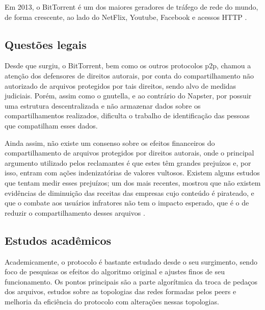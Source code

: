 Em 2013, o BitTorrent é um dos maiores geradores de tráfego de rede do mundo, de forma
crescente, ao lado do NetFlix, Youtube, Facebook e acessos HTTP
\cite{report:internet-usage-2013}.

\subsection*{Questões legais}

Desde que surgiu, o BitTorrent, bem como os outros protocolos \gls*{p2p}, chamou a
atenção dos defensores de direitos autorais, por conta do compartilhamento não
autorizado de arquivos protegidos por tais direitos, sendo alvo de medidas judiciais.
Porém, assim como o \gls*{gnutella}, e ao contrário do Napster, por possuir uma
estrutura descentralizada e não armazenar dados sobre os compartilhamentos realizados,
dificulta o trabalho de identificação das pessoas que compatilham esses dados.

Ainda assim, não existe um consenso sobre os efeitos financeiros do compartilhamento de
arquivos protegidos por direitos autorais, onde o principal argumento utilizado pelos
reclamantes é que estes têm grandes prejuízos e, por isso, entram com ações
indenizatórias de valores vultosos. Existem alguns estudos que tentam medir esses
prejuízos; um dos mais recentes, mostrou que não existem evidências de diminuição das
receitas das empresas cujo conteúdo é pirateado, e que o combate aos usuários
infratores não tem o impacto esperado, que é o de reduzir o compartilhamento desses
arquivos \cite{report:lse-piracy}.

\subsection*{Estudos acadêmicos}

Academicamente, o protocolo é bastante estudado desde o seu surgimento, sendo foco de
pesquisas os efeitos do algoritmo original e ajustes finos de seu funcionamento. Os
pontos principais são a parte algorítmica da troca de pedaços dos arquivos, estudos
sobre as topologias das redes formadas pelos \glspl*{peer} e melhoria da eficiência
do protocolo com alterações nessas topologias.

\afterpage{\clearpage}